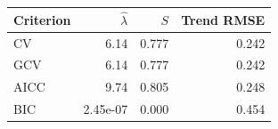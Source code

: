 \begin{tabular}{lrrr}
\hline
Criterion & $\widehat\lambda$ & $S$ & Trend RMSE \\
\hline
CV & 6.14 & 0.777 & 0.242 \\
GCV & 6.14 & 0.777 & 0.242 \\
AICC & 9.74 & 0.805 & 0.248 \\
BIC & 2.45e-07 & 0.000 & 0.454 \\
\hline
\end{tabular}
